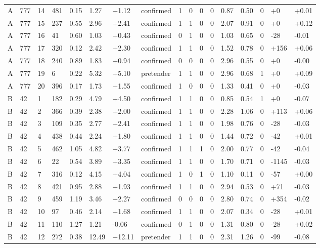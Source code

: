 \documentclass[11pt,a4paper]{article}
\begin{document}
{\begin{longtable}[]{@{}lllllllllllllllll@{}}
A & 777 & 14 & 481 & 0.15 & 1.27 & +1.12 & confirmed & 1 & 0 & 0 & 0 & 0.87 & 0.50 & 0 & +0 & +0.01 \\
A & 777 & 15 & 237 & 0.55 & 2.96 & +2.41 & confirmed & 1 & 1 & 0 & 0 & 2.07 & 0.91 & 0 & +0 & +0.12 \\
A & 777 & 16 & 41 & 0.60 & 1.03 & +0.43 & confirmed & 0 & 1 & 0 & 0 & 1.03 & 0.65 & 0 & -28 & -0.01 \\
A & 777 & 17 & 320 & 0.12 & 2.42 & +2.30 & confirmed & 1 & 1 & 0 & 0 & 1.52 & 0.78 & 0 & +156 & +0.06 \\
A & 777 & 18 & 240 & 0.89 & 1.83 & +0.94 & confirmed & 0 & 0 & 0 & 0 & 2.96 & 0.55 & 0 & +0 & -0.00 \\
A & 777 & 19 & 6 & 0.22 & 5.32 & +5.10 & pretender & 1 & 1 & 0 & 0 & 2.96 & 0.68 & 1 & +0 & +0.09 \\
A & 777 & 20 & 396 & 0.17 & 1.73 & +1.55 & confirmed & 1 & 0 & 0 & 0 & 1.33 & 0.41 & 0 & +0 & -0.03 \\
B & 42 & 1 & 182 & 0.29 & 4.79 & +4.50 & confirmed & 1 & 1 & 0 & 0 & 0.85 & 0.54 & 1 & +0 & -0.07 \\
B & 42 & 2 & 366 & 0.39 & 2.38 & +2.00 & confirmed & 1 & 1 & 0 & 0 & 2.28 & 1.06 & 0 & +113 & +0.06 \\
B & 42 & 3 & 109 & 0.35 & 2.77 & +2.41 & confirmed & 1 & 1 & 0 & 0 & 1.98 & 0.76 & 0 & -28 & -0.03 \\
B & 42 & 4 & 438 & 0.44 & 2.24 & +1.80 & confirmed & 1 & 1 & 0 & 0 & 1.44 & 0.72 & 0 & -42 & +0.01 \\
B & 42 & 5 & 462 & 1.05 & 4.82 & +3.77 & confirmed & 1 & 1 & 1 & 0 & 2.00 & 0.77 & 0 & -42 & -0.04 \\
B & 42 & 6 & 22 & 0.54 & 3.89 & +3.35 & confirmed & 1 & 1 & 0 & 0 & 1.70 & 0.71 & 0 & -1145 & -0.03 \\
B & 42 & 7 & 316 & 0.12 & 4.15 & +4.04 & confirmed & 1 & 0 & 1 & 0 & 1.10 & 0.11 & 0 & -57 & +0.00 \\
B & 42 & 8 & 421 & 0.95 & 2.88 & +1.93 & confirmed & 1 & 1 & 0 & 0 & 2.94 & 0.53 & 0 & +71 & -0.03 \\
B & 42 & 9 & 459 & 1.19 & 3.46 & +2.27 & confirmed & 0 & 0 & 0 & 0 & 2.80 & 0.74 & 0 & +354 & -0.02 \\
B & 42 & 10 & 97 & 0.46 & 2.14 & +1.68 & confirmed & 1 & 1 & 0 & 0 & 2.07 & 0.34 & 0 & -28 & +0.01 \\
B & 42 & 11 & 110 & 1.27 & 1.21 & -0.06 & confirmed & 0 & 1 & 0 & 0 & 1.31 & 0.80 & 0 & -28 & +0.02 \\
B & 42 & 12 & 272 & 0.38 & 12.49 & +12.11 & pretender & 1 & 1 & 0 & 0 & 2.31 & 1.26 & 0 & -99 & -0.08 \\

\end{longtable}}
\end{document}
